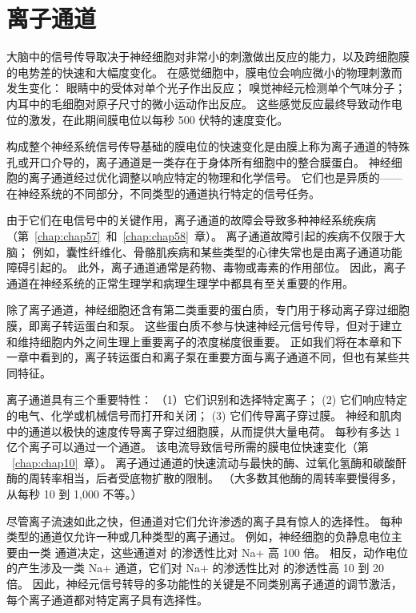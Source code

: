 \chapter{离子通道} \label{chap:chap8}

大脑中的信号传导取决于神经细胞对非常小的刺激做出反应的能力，以及跨细胞膜的电势差的快速和大幅度变化。 
在感觉细胞中，膜电位会响应微小的物理刺激而发生变化：
眼睛中的受体对单个光子作出反应；
嗅觉神经元检测单个气味分子；
内耳中的毛细胞对原子尺寸的微小运动作出反应。
这些感觉反应最终导致动作电位的激发，在此期间膜电位以每秒 500 伏特的速度变化。


构成整个神经系统信号传导基础的膜电位的快速变化是由膜上称为离子通道的特殊孔或开口介导的，离子通道是一类存在于身体所有细胞中的整合膜蛋白。
神经细胞的离子通道经过优化调整以响应特定的物理和化学信号。
它们也是异质的——在神经系统的不同部分，不同类型的通道执行特定的信号任务。


由于它们在电信号中的关键作用，离子通道的故障会导致多种神经系统疾病（第~\ref{chap:chap57}~和~\ref{chap:chap58}~章）。
离子通道故障引起的疾病不仅限于大脑；
例如，囊性纤维化、骨骼肌疾病和某些类型的心律失常也是由离子通道功能障碍引起的。
此外，离子通道通常是药物、毒物或毒素的作用部位。
因此，离子通道在神经系统的正常生理学和病理生理学中都具有至关重要的作用。


除了离子通道，神经细胞还含有第二类重要的蛋白质，专门用于移动离子穿过细胞膜，即离子转运蛋白和泵。
这些蛋白质不参与快速神经元信号传导，但对于建立和维持细胞内外之间生理上重要离子的浓度梯度很重要。
正如我们将在本章和下一章中看到的，离子转运蛋白和离子泵在重要方面与离子通道不同，但也有某些共同特征。


离子通道具有三个重要特性：
（1）它们识别和选择特定离子；
(2) 它们响应特定的电气、化学或机械信号而打开和关闭；
(3) 它们传导离子穿过膜。
神经和肌肉中的通道以极快的速度传导离子穿过细胞膜，从而提供大量电荷。
每秒有多达 1 亿个离子可以通过一个通道。
该电流导致信号所需的膜电位快速变化（第 ~\ref{chap:chap10}~章）。
离子通过通道的快速流动与最快的酶、过氧化氢酶和碳酸酐酶的周转率相当，后者受底物扩散的限制。
（大多数其他酶的周转率要慢得多，从每秒 10 到 1,000 不等。）


尽管离子流速如此之快，但通道对它们允许渗透的离子具有惊人的选择性。
每种类型的通道仅允许一种或几种类型的离子通过。
例如，神经细胞的负静息电位主要由一类  通道决定，这些通道对  的渗透性比对 Na+ 高 100 倍。
相反，动作电位的产生涉及一类 Na+ 通道，它们对 Na+ 的渗透性比对  的渗透性高 10 到 20 倍。
因此，神经元信号转导的多功能性的关键是不同类别离子通道的调节激活，每个离子通道都对特定离子具有选择性。


